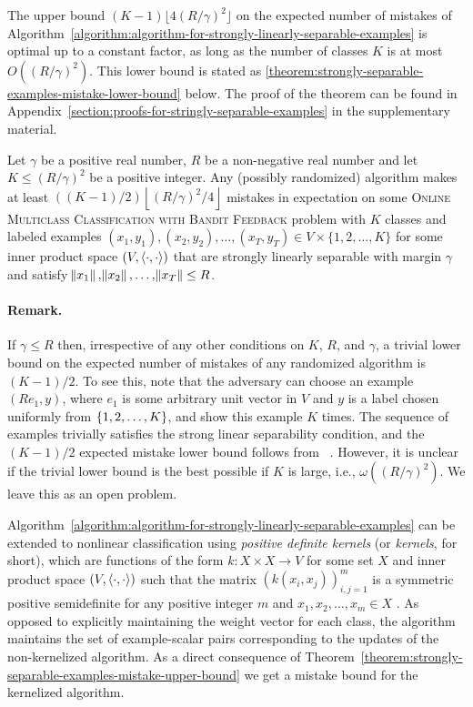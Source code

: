 The upper bound $(K-1) \lfloor 4(R/\gamma)^2 \rfloor$ on the expected number of
mistakes of
Algorithm~\ref{algorithm:algorithm-for-strongly-linearly-separable-examples} is
optimal up to a constant factor, as long as the number of classes $K$ is at most
$O((R/\gamma)^2)$. This lower bound is stated as
\autoref{theorem:strongly-separable-examples-mistake-lower-bound} below. The
proof of the theorem can be found in
Appendix~\ref{section:proofs-for-stringly-separable-examples} in the
supplementary material.

\begin{theorem}
\label{theorem:strongly-separable-examples-mistake-lower-bound}
Let $\gamma$ be a positive real number, $R$ be a non-negative real number and
let $K \le (R/\gamma)^2$ be a positive integer. Any (possibly randomized)
algorithm makes at least $((K-1)/2)\left\lfloor (R/\gamma)^2/4 \right\rfloor$
mistakes in expectation on some \textsc{Online Multiclass Classification with
Bandit Feedback} problem with $K$ classes and labeled examples $(x_1, y_1),
(x_2, y_2), \dots, (x_T, y_T) \in V \times \{1,2,\dots,K\}$ for some inner
product space $(V, \left\langle \cdot, \cdot \right\rangle)$ that are strongly linearly separable with
margin $\gamma$ and satisfy $\norm{x_1}, \norm{x_2}, \dots, \norm{x_T} \le R$.
\end{theorem}

\paragraph{Remark.}
If $\gamma \le R$ then, irrespective of any other conditions on $K$, $R$, and
$\gamma$, a trivial lower bound on the expected number of mistakes of any
randomized algorithm is $(K-1)/2$. To see this, note that the adversary can
choose an example $(R e_1, y)$, where $e_1$ is some arbitrary unit vector in $V$
and $y$ is a label chosen uniformly from $\cbr{1,2,\dots,K}$, and show this
example $K$ times. The sequence of examples trivially satisfies the strong
linear separability condition, and the $(K-1)/2$ expected mistake lower bound
follows from ~\citep[][Claim 2]{Daniely-Helbertal-2013}. However, it is unclear
if the trivial lower bound is the best possible if $K$ is large, i.e.,
$\omega((R/\gamma)^2)$. We leave this as an open problem.

Algorithm~\ref{algorithm:algorithm-for-strongly-linearly-separable-examples} can
be extended to nonlinear classification using \emph{positive definite kernels}
(or \emph{kernels}, for short), which are functions of the form $k: X \times X
\to V$ for some set $X$ and inner product space $(V, \left\langle \cdot, \cdot \right\rangle)$ such
that the matrix $\left(k(x_i,x_j)\right)_{i,j=1}^m$ is a symmetric positive
semidefinite for any positive integer $m$ and $x_1, x_2, \dots, x_m \in X$
\citep[Definition 2.5]{Scholkopf-Smola-2002}. As opposed to explicitly
maintaining the weight vector for each class, the algorithm maintains the set of
example-scalar pairs corresponding to the updates of the non-kernelized
algorithm. As a direct consequence of
Theorem~\ref{theorem:strongly-separable-examples-mistake-upper-bound} we get a
mistake bound for the kernelized algorithm.

